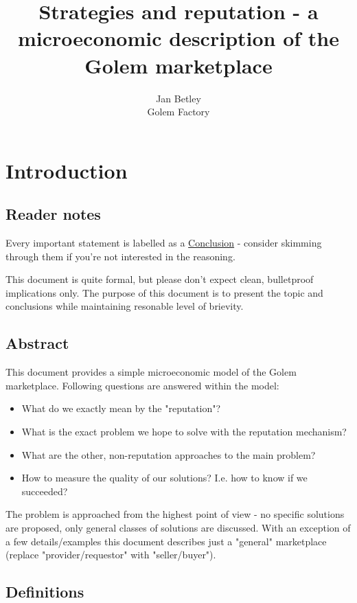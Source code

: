 \documentclass{article}
\title{Strategies and reputation - a microeconomic description of the Golem marketplace}
\author{Jan Betley\\ Golem Factory}
\begin{document}
\maketitle
\section{Introduction}
\subsection{Reader notes}

Every important statement is labelled as a \underline{Conclusion} - consider skimming through them if you're not interested in the reasoning.

This document is quite formal, but please don't expect clean, bulletproof implications only. The purpose of this document is to
present the topic and conclusions while maintaining resonable level of brievity.

\subsection{Abstract}
This document provides a simple microeconomic model of the Golem marketplace. 
Following questions are answered within the model:

\begin{itemize}
\item What do we exactly mean by the "reputation"?
\item What is the exact problem we hope to solve with the reputation mechanism?
\item What are the other, non-reputation approaches to the main problem?
\item How to measure the quality of our solutions? I.e. how to know if we succeeded?
\end{itemize}


The problem is approached from the highest point of view - no specific solutions are proposed, only general classes of solutions are discussed.
With an exception of a few details/examples this document describes just a "general" marketplace (replace "provider/requestor" with "seller/buyer").

\subsection{Definitions}
\end{document}
